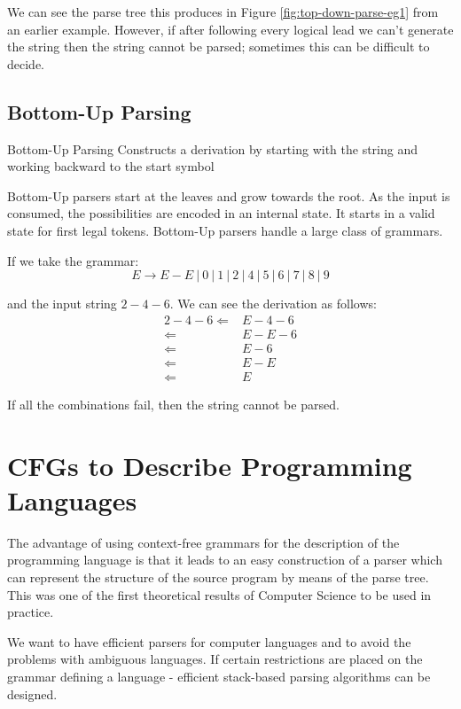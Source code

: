 We can see the parse tree this produces in Figure \ref{fig:top-down-parse-eg1} from an earlier example. However, if after following every logical lead we can't generate the string then the string cannot be parsed; sometimes this can be difficult to decide.

\subsection{Bottom-Up Parsing}
\begin{define}
\item[Bottom-Up Parsing] Constructs a derivation by starting with the string and working backward to the start symbol
\end{define}

Bottom-Up parsers start at the leaves and grow towards the root. As the input is consumed, the possibilities are encoded in an internal state. It starts in a valid state for first legal tokens. Bottom-Up parsers handle a large class of grammars.

If we take the grammar:
\[E \rightarrow E - E\ |\ 0\ |\ 1\ |\ 2\ |\ 4\ |\ 5\ |\ 6\ |\ 7\ |\ 8\ |\ 9\]

and the input string $2 - 4 - 6$. We can see the derivation as follows:
\begin{align*}
2 - 4 - 6 \Leftarrow & E - 4 - 6\\
\Leftarrow & E - E - 6\\
\Leftarrow & E - 6\\
\Leftarrow & E - E\\
\Leftarrow & E
\end{align*}

If all the combinations fail, then the string cannot be parsed. 

\section{CFGs to Describe Programming Languages}
The advantage of using context-free grammars for the description of the programming language is that it leads to an easy construction of a parser which can represent the structure of the source program by means of the parse tree. This was one of the first theoretical results of Computer Science to be used in practice.

We want to have efficient parsers for computer languages and to avoid the problems with ambiguous languages. If certain restrictions are placed on the grammar defining a language - efficient stack-based parsing algorithms can be designed. 

